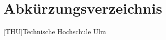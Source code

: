 \newpage
\thispagestyle{plain}

\chapter*{Abkürzungsverzeichnis}

\begin{acronym}[JSON] %
	[THU]{Technische Hochschule Ulm}
\end{acronym}
